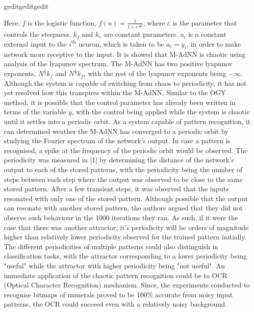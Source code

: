 geditgeditgedit\documentclass[12pt, letterpaper]{article}
\begin{document}
Here, $f$ is the logistic function, $f(u) = \frac{1}{1 + e^\frac{-u}{\varepsilon}}$, where $\varepsilon$ is the parameter that controls the steepness. $k_f$ and $k_r$ are constant parameters. $a_i$ is a constant external input to the $i^{\text{th}}$ neuron, which is taken to be $a_i = y_i$, in order to make network more receptive to the input.
It is showed that M-AdNN is chaotic using analysis of the lyapunov spectrum. The M-AdNN has two positive lyapunov exponents, $N^{\frac{1}{2}}k_f$ and $N^{\frac{1}{2}}k_f$, with the rest of the lyapunov exponents being $-\infty$. Although the system is capable of switching from chaos to periodicity, it has not yet resolved how this transpires within the M-AdNN. Similar to the OGY method, it is possible that the control parameter has already been written in terms of the variable $y$, with the control being applied while the system is chaotic until it settles into a periodic orbit. As a system capable of pattern recognition, it can determined weather the M-AdNN has converged to a periodic orbit by studying the Fourier spectrum of the network's output. In case a pattern is recognised, a spike at the frequency of the periodic orbit would be observed. The periodicity was measured in [1] by determining the distance of the network's output to each of the stored patterns, with the periodicity being the number of steps between each step where the output was observed to be close to the same stored pattern. After a few transient steps, it was observed that the inputs resonated with only one of the stored pattern. Although possible that the output can resonate with another stored pattern, the authors argued that they did not observe such behaviour in the 1000 iterations they ran. As such, if it were the case that there was another attractor, it's periodicity will be orders of magnitude higher than relatively lower periodicity observed for the trained pattern initially. The different periodicities of multiple patterns could also distinguish in classification tasks, with the attractor corresponding to a lower periodicity being "useful" while the attractor with higher periodicity being "not useful". An immediate application of the chaotic pattern recognition could be to OCR (Optical Character Recognition) mechanism. Since, the experiments conducted to recognise bitmaps of numerals proved to be 100\% accurate from noisy input patterns, the OCR could succeed even with a relatively noisy background.
\end{document}
